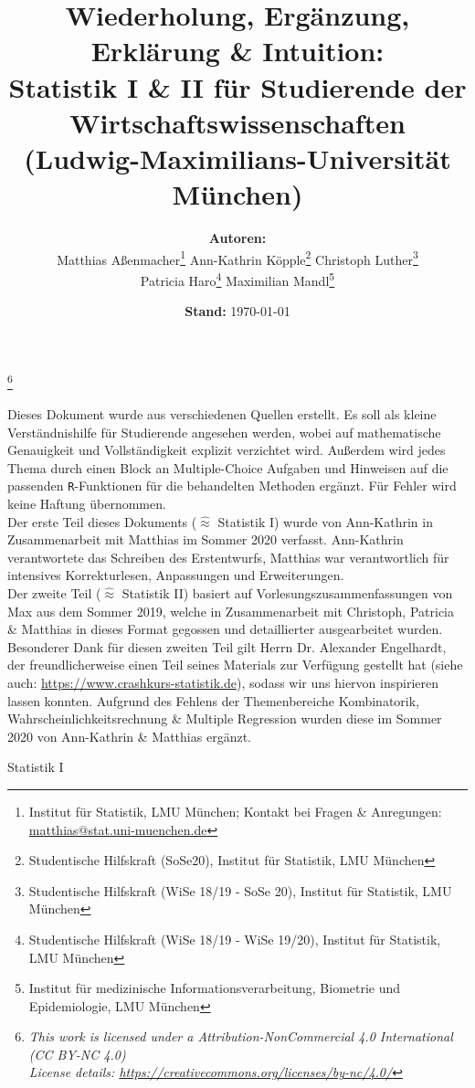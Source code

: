 \documentclass[a4paper]{article}
\title{%
  \large Wiederholung, Ergänzung, Erklärung \& Intuition:\\
  \Large Statistik I \& II für Studierende der Wirtschaftswissenschaften\\
  \large (Ludwig-Maximilians-Universität München)
}
\date{\textbf{Stand:} \today}
\author{\textbf{Autoren:}\\ 
Matthias Aßenmacher\thanks{Institut für Statistik, LMU München; Kontakt bei Fragen \& Anregungen: \url{matthias@stat.uni-muenchen.de}}\qquad
Ann-Kathrin Köpple\thanks{Studentische Hilfskraft (SoSe20), Institut für Statistik, LMU München}\qquad
Christoph Luther\thanks{Studentische Hilfskraft (WiSe 18/19 - SoSe 20), Institut für Statistik, LMU München}\\
Patricia Haro\thanks{Studentische Hilfskraft (WiSe 18/19 - WiSe 19/20), Institut für Statistik, LMU München}\qquad
Maximilian Mandl\thanks{Institut für medizinische Informationsverarbeitung, Biometrie und Epidemiologie, LMU München\vspace{.25cm}}}
\newcommand\blfootnote[1]{%
  \begingroup
  \renewcommand\thefootnote{}\footnote{#1}%
  \addtocounter{footnote}{-1}%
  \endgroup
}
\begin{document}
\maketitle

\blfootnote{
\hspace{-0.75cm} 
\textit{\small 
This work is licensed under a Attribution-NonCommercial 4.0 International (CC BY-NC 4.0)\\          
License details: \url{https://creativecommons.org/licenses/by-nc/4.0/}}
}

\noindent Dieses  Dokument wurde aus verschiedenen Quellen erstellt. Es soll als kleine Verständnishilfe für Studierende angesehen werden, wobei auf mathematische Genauigkeit und Vollständigkeit explizit verzichtet wird. Außerdem wird jedes Thema durch einen Block an Multiple-Choice Aufgaben und Hinweisen auf die passenden \texttt{R}-Funktionen für die behandelten Methoden ergänzt. Für Fehler wird keine Haftung übernommen.\\

\noindent Der erste Teil dieses Dokuments ($\widehat \approx$ Statistik I) wurde von Ann-Kathrin in Zusammenarbeit mit Matthias im Sommer 2020 verfasst. Ann-Kathrin verantwortete das Schreiben des Erstentwurfs, Matthias war verantwortlich für intensives Korrekturlesen, Anpassungen und Erweiterungen.\\
Der zweite Teil ($\widehat \approx$ Statistik II) basiert auf Vorlesungszusammenfassungen von Max aus dem Sommer 2019, welche in Zusammenarbeit mit Christoph, Patricia \& Matthias in dieses Format gegossen und detaillierter ausgearbeitet wurden. Besonderer Dank für diesen zweiten Teil gilt Herrn Dr. Alexander Engelhardt, der freundlicherweise einen Teil seines Materials zur Verfügung gestellt hat (siehe auch: \url{https://www.crashkurs-statistik.de}), sodass wir uns hiervon inspirieren lassen konnten. Aufgrund des Fehlens der Themenbereiche Kombinatorik, Wahrscheinlichkeitsrechnung \& Multiple Regression wurden diese im Sommer 2020 von Ann-Kathrin \& Matthias ergänzt.

\clearpage

\tableofcontents

\clearpage

\hspace{0pt}
\vfill
\begin{center}
    {\Huge Statistik I}
\end{center}
\vfill
\hspace{0pt}

\clearpage
\end{document}
